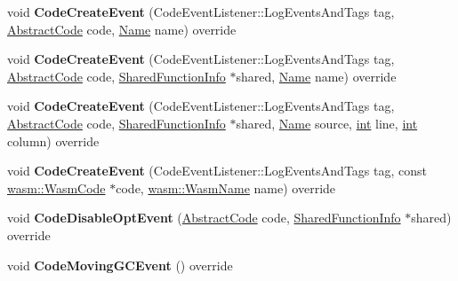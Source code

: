 \begin{DoxyCompactItemize}
void {\bfseries Code\+Create\+Event} (Code\+Event\+Listener\+::\+Log\+Events\+And\+Tags tag, \mbox{\hyperlink{classv8_1_1internal_1_1AbstractCode}{Abstract\+Code}} code, \mbox{\hyperlink{classv8_1_1internal_1_1Name}{Name}} name) override
\item 
\mbox{\label{classv8_1_1internal_1_1Logger_aeafedc3c255a459c72b6a7045d932f88}} 
void {\bfseries Code\+Create\+Event} (Code\+Event\+Listener\+::\+Log\+Events\+And\+Tags tag, \mbox{\hyperlink{classv8_1_1internal_1_1AbstractCode}{Abstract\+Code}} code, \mbox{\hyperlink{classv8_1_1internal_1_1SharedFunctionInfo}{Shared\+Function\+Info}} $\ast$shared, \mbox{\hyperlink{classv8_1_1internal_1_1Name}{Name}} name) override
\item 
\mbox{\label{classv8_1_1internal_1_1Logger_a5b6dbff45edff7b0da82962766e1ff15}} 
void {\bfseries Code\+Create\+Event} (Code\+Event\+Listener\+::\+Log\+Events\+And\+Tags tag, \mbox{\hyperlink{classv8_1_1internal_1_1AbstractCode}{Abstract\+Code}} code, \mbox{\hyperlink{classv8_1_1internal_1_1SharedFunctionInfo}{Shared\+Function\+Info}} $\ast$shared, \mbox{\hyperlink{classv8_1_1internal_1_1Name}{Name}} source, \mbox{\hyperlink{classint}{int}} line, \mbox{\hyperlink{classint}{int}} column) override
\item 
\mbox{\label{classv8_1_1internal_1_1Logger_aff1f50c6c4da784a01f7753b5734a0de}} 
void {\bfseries Code\+Create\+Event} (Code\+Event\+Listener\+::\+Log\+Events\+And\+Tags tag, const \mbox{\hyperlink{classv8_1_1internal_1_1wasm_1_1WasmCode}{wasm\+::\+Wasm\+Code}} $\ast$code, \mbox{\hyperlink{classv8_1_1internal_1_1Vector}{wasm\+::\+Wasm\+Name}} name) override
\item 
\mbox{\label{classv8_1_1internal_1_1Logger_a518f5a851b84f7311268f8d2806123fc}} 
void {\bfseries Code\+Disable\+Opt\+Event} (\mbox{\hyperlink{classv8_1_1internal_1_1AbstractCode}{Abstract\+Code}} code, \mbox{\hyperlink{classv8_1_1internal_1_1SharedFunctionInfo}{Shared\+Function\+Info}} $\ast$shared) override
\item 
\mbox{\label{classv8_1_1internal_1_1Logger_a7904fcde2b16c9c1ac72d4f2b73fbf15}} 
void {\bfseries Code\+Moving\+G\+C\+Event} () override
\item 

\end{DoxyCompactItemize}
